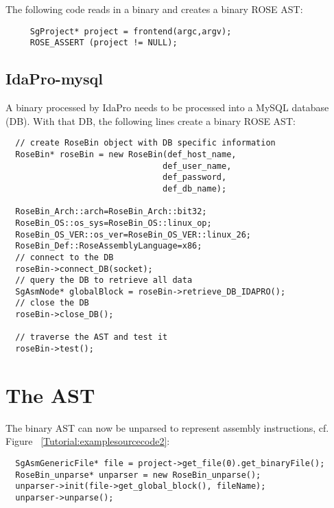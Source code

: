 The following code reads in a binary and creates a binary ROSE AST:

{\mySmallFontSize
\begin{verbatim}
     SgProject* project = frontend(argc,argv);
     ROSE_ASSERT (project != NULL);
\end{verbatim}
}


\subsection{IdaPro-mysql}

A binary processed by IdaPro needs to be processed into a MySQL database (DB). With that DB,
the following lines create a binary ROSE AST:


{\mySmallFontSize
\begin{verbatim}
  // create RoseBin object with DB specific information 
  RoseBin* roseBin = new RoseBin(def_host_name,
                                def_user_name,
                                def_password,
                                def_db_name);

  RoseBin_Arch::arch=RoseBin_Arch::bit32;
  RoseBin_OS::os_sys=RoseBin_OS::linux_op;
  RoseBin_OS_VER::os_ver=RoseBin_OS_VER::linux_26;
  RoseBin_Def::RoseAssemblyLanguage=x86;
  // connect to the DB
  roseBin->connect_DB(socket);
  // query the DB to retrieve all data
  SgAsmNode* globalBlock = roseBin->retrieve_DB_IDAPRO();
  // close the DB
  roseBin->close_DB();

  // traverse the AST and test it
  roseBin->test();
\end{verbatim}
}




\section{The AST}

The binary AST can now be unparsed to represent assembly instructions, cf. Figure ~\ref{Tutorial:examplesourcecode2}:

{\mySmallFontSize
\begin{verbatim}
  SgAsmGenericFile* file = project->get_file(0).get_binaryFile();
  RoseBin_unparse* unparser = new RoseBin_unparse();
  unparser->init(file->get_global_block(), fileName);
  unparser->unparse();
\end{verbatim}
}


